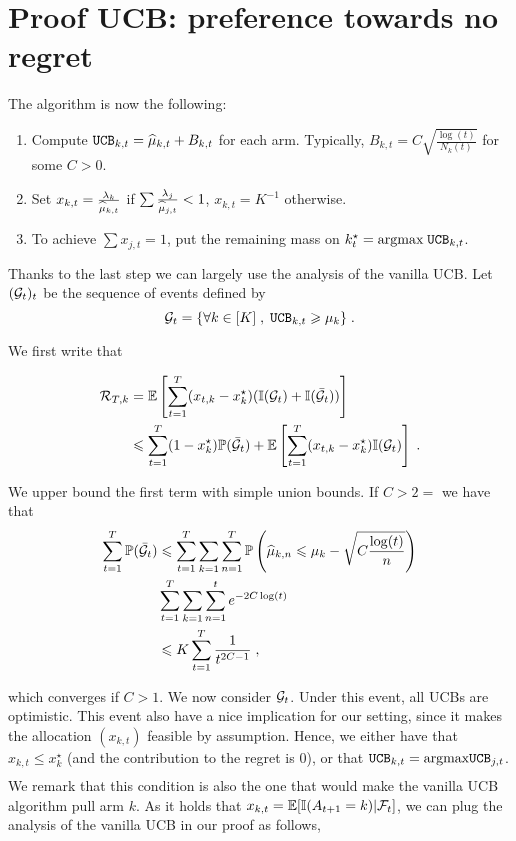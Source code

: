 \section{Proof UCB: preference towards no regret}

The algorithm is now the following:
\begin{enumerate}
	\item Compute $\texttt{UCB}_{k, t} = \widehat{\mu}_{k, t} + B_{k, t}$ for each arm. Typically, $B_{k, t}=C\sqrt{\frac{\log(t)}{N_k(t)}}$ for some $C>0$.
	\item Set $x_{k,t} = \frac{\lambda_k}{\widehat{\mu}_{k, t}}$ if $\sum \frac{\lambda_j}{\widehat{\mu}_{j, t}}<1$, $x_{k, t}=K^{-1}$ otherwise.
	\item To achieve $\sum x_{j, t}=1$, put the remaining mass on $k_t^\star=\text{argmax}{} \; \texttt{UCB}_{k, t}$.
\end{enumerate}

Thanks to the last step we can largely use the analysis of the vanilla UCB. Let $(\mathcal{G}_t)_t$ be the sequence of events defined by 
\[\mathcal{G}_t = \{\forall k \in [K]\;, \; \texttt{UCB}_{k, t}\geqslant \mu_k\} \;. \]

We first write that

\begin{align*}
\mathcal{R}_{T,k} &= \mathbb{E}\left[\sum_{t=1}^T (x_{t, k} - x^\star_k)(\mathbb{I}(\mathcal{G}_t)+\mathbb{I}(\bar {\mathcal{G}}_t))\right] \\
& \leqslant \sum_{t=1}^T (1-x_k^\star) \mathbb{P}(\bar {\mathcal{G}}_t) + \mathbb{E}\left[\sum_{t=1}^T (x_{t,k} - x_k^\star)\mathbb{I}(\mathcal{G}_t)\right] \;.
\end{align*}

We upper bound the first term with simple union bounds. If $C>2=$ we have that 
\begin{align*}
\sum_{t=1}^T \mathbb{P}(\bar {\mathcal{G}}_t) &\leqslant \sum_{t=1}^T \sum_{k=1} \sum_{n=1}^{T}\mathbb{P}\left(\widehat{\mu}_{k,n}\leqslant \mu_k - \sqrt{C\frac{\log(t)}{n}}\right) \\
& \sum_{t=1}^T \sum_{k=1} \sum_{n=1}^{t}e^{-2C \log(t)} \\
& \leqslant K\sum_{t=1}^T \frac{1}{t^{2C-1}}\;,
\end{align*}

which converges if $C>1$. We now consider $\mathcal{G}_t$. Under this event, all UCBs are optimistic. This event also have a nice implication for our setting, since it makes the allocation $(x_{k,t})$ feasible by assumption. Hence, we either have that $x_{k,t}\leq x_k^\star$ (and the contribution to the regret is $0$), or that $\texttt{UCB}_{k,t}=\underset{}{\text{argmax}} \texttt{UCB}_{j, t}$. We remark that this condition is also the one that would make the vanilla UCB algorithm pull arm $k$. As it holds that $x_{k,t} = \mathbb{E}[\mathbb{I}(A_{t+1}=k)|\mathcal{F}_t]$, we can plug the analysis of the vanilla UCB in our proof as follows,

